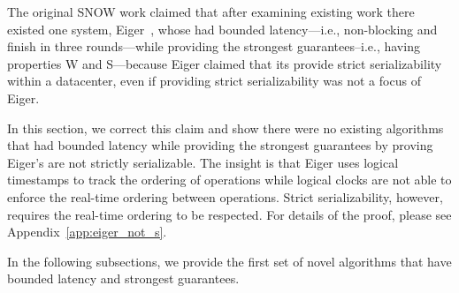 The original SNOW work claimed that after examining existing work there existed one system, Eiger~\cite{Lloyd:nsdi2013}, whose \rots{} had bounded latency---i.e., non-blocking and finish in three rounds---while providing the strongest guarantees--i.e., having properties W and S---because Eiger claimed that its \rots{} provide strict serializability within a datacenter, even if providing strict serializability was not a focus of Eiger. 

In this section, we correct this claim and show there were no existing algorithms that had bounded latency while providing the strongest guarantees by proving Eiger's \rots{} are not strictly serializable. The insight is that Eiger uses logical timestamps to track the ordering of operations while logical clocks are not able to enforce the real-time ordering between operations. Strict serializability, however, requires the real-time ordering to be respected. For details of the proof, please see Appendix~\ref{app:eiger_not_s}.

In the following subsections, we provide the first set of novel algorithms that have bounded latency and  strongest guarantees.
